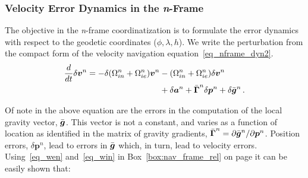 \documentclass[journal]{IEEEtran}
\begin{document}
\subsubsection{Velocity Error Dynamics in the \textit{n}-Frame}
The objective in the \textit{n}-frame coordinatization is to formulate the error dynamics with respect to the geodetic coordinates ($\phi, \lambda,h$). We write the perturbation from the compact form of the velocity navigation equation~\eqref{eq_nframe_dyn2}.
\begin{equation}\label{eq_erdyn}
\begin{aligned}
    \frac{d}{dt}\delta \boldsymbol{v}^n=-\delta({{\Omega}}_{in}^{n}+{{\Omega}}_{ie}^{n}){\boldsymbol{v}}^{n}&- ({{\Omega}}_{in}^{n}+{{\Omega}}_{ie}^{n})\delta{\boldsymbol{v}}^{n}\\
    &+ \delta \boldsymbol{a}^n +{\Bar{\boldsymbol{\Gamma}}}^n \delta \boldsymbol{p}^n +\delta{\Bar{\boldsymbol{g}}}^n\,.
    \end{aligned}
\end{equation}

Of note in the above equation are the errors in the computation of the local gravity vector, ${\Bar{\boldsymbol{g}}}$.
This vector is not a constant, and varies as a function of location as identified in the matrix of gravity gradients, ${\Bar{\boldsymbol{\Gamma}}}^n={\partial{\Bar{\boldsymbol{g}}}^n}/{\partial{{\boldsymbol{p}}}^n}$. Position errors, $\delta{{\boldsymbol{p}}}^n$, 
lead to errors in ${\Bar{\boldsymbol{g}}}$ which, in turn, lead to velocity errors. Using~\eqref{eq_wen} and~\eqref{eq_win} in Box~\ref{box:nav_frame_rel} on page \pageref{box:nav_frame_rel} it can be easily shown that:



\end{document}
